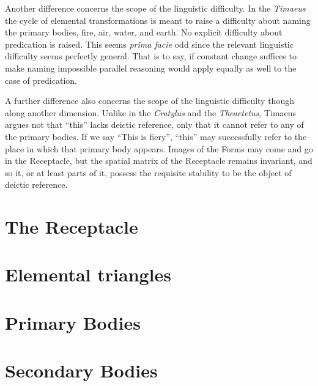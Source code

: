 Another difference concerns the scope of the linguistic difficulty. In the \emph{Timaeus} the cycle of elemental transformations is meant to raise a difficulty about naming the primary bodies, fire, air, water, and earth. No explicit difficulty about predication is raised. This seems \emph{prima facie} odd since the relevant linguistic difficulty seems perfectly general. That is to say, if constant change suffices to make naming impossible parallel reasoning would apply equally as well to the case of predication.

A further difference also concerns the scope of the linguistic difficulty though along another dimension. Unlike in the \emph{Cratylus} and the \emph{Theaetetus}, Timaeus argues not that ``this'' lacks deictic reference, only that it cannot refer to any of the primary bodies. If we say ``This is fiery'', ``this'' may successfully refer to the place in which that primary body appears. Images of the Forms may come and go in the Receptacle, but the spatial matrix of the Receptacle remains invariant, and so it, or at least parts of it, possess the requisite stability to be the object of deictic reference.


\section{The Receptacle} %
\label{sec:the_receptacle}




\section{Elemental triangles} %
\label{sec:elemental_triangles}




\section{Primary Bodies} %
\label{sec:primary_bodies}




\section{Secondary Bodies} %
\label{sec:secondary_bodies}




